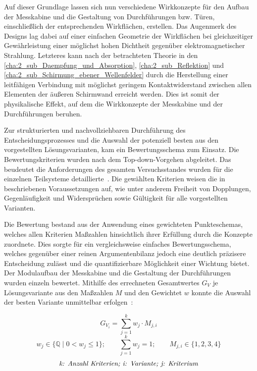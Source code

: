 Auf dieser Grundlage lassen sich nun verschiedene Wirkkonzepte für den Aufbau der Messkabine und die Gestaltung von Durchführungen bzw. Türen, einschließlich der entsprechenden Wirkflächen, erstellen. Das Augenmerk des Designs lag dabei auf einer einfachen Geometrie der Wirkflächen bei gleichzeitiger Gewährleistung einer möglichst hohen Dichtheit gegenüber elektromagnetischer Strahlung. Letzteres kann nach der betrachteten Theorie in den \Abschnitten\ref{cha:2_sub_Daempfung_und_Absorption}, \ref{cha:2_sub_Reflektion} und \ref{cha:2_sub_Schirmung_ebener_Wellenfelder} durch die Herstellung einer leitfähigen Verbindung mit möglichst geringem Kontaktwiderstand zwischen allen Elementen der äußeren Schirmwand erreicht werden. Dies ist somit der physikalische Effekt, auf dem die Wirkkonzepte der Messkabine und der Durchführungen beruhen. 
\par
\vspace{\linespace}
Zur strukturierten und nachvollziehbaren Durchführung des Entscheidungsprozesses und die Auswahl der potenziell besten aus den vorgestellten Lösungsvarianten, kam ein Bewertungsschema zum Einsatz. Die Bewertungskriterien wurden nach dem Top-down-Vorgehen abgeleitet. Das beudeutet die Anforderungen des gesamten Versuchsstandes wurden für die einzelnen Teilsysteme detaillierte~\cite{Pahl_Beitz_Konstruktionslehre}. Die gewählten Kriterien weisen die in~\cite{Pahl_Beitz_Konstruktionslehre} beschriebenen Voraussetzungen auf, wie unter anderem Freiheit von Dopplungen, Gegenläufigkeit und Widersprüchen sowie Gültigkeit für alle vorgestellten Varianten.
\par
\vspace{\linespace}
Die Bewertung bestand aus der Anwendung eines gewichteten Punkteschemas, welches allen Kriterien Maßzahlen hinsichtlich ihrer Erfüllung durch die Konzepte zuordnete. Dies sorgte für ein vergleichsweise einfaches Bewertungsschema, welches gegenüber einer reinen Argumentenbilanz jedoch eine deutlich präzisere Entscheidung zulässt und die quantifizierbare Möglichkeit einer Wichtung bietet. Der Modulaufbau der Messkabine und die Gestaltung der Durchführungen wurden einzeln bewertet. Mithilfe des errechneten Gesamtwertes $G_V$ je Lösungsvariante aus den Maßzahlen $M$ und den Gewichtet $w$ konnte die Auswahl der besten Variante unmittelbar erfolgen~\cite{Pahl_Beitz_Konstruktionslehre}:

\begin{equation}
    G_{V_i} = \sum_{j=1}^{k} w_j \cdot M_{j,i}
    \label{eq:3_Gesamtwert_Variantenvergleich}
\end{equation}
\begin{equation}
    w_j \in \{\mathbb{Q} \;\vert\; 0 < w_j \leq 1\}; \qquad \sum_{j=1}^{k} w_j = 1; \qquad M_{j,i} \in \{1,2,3,4\}
    \label{eq:3_Wichtung_Bewertung}
\end{equation}
\begin{equation*}
    \text{\textit{k: Anzahl Kriterien; i: Variante; j: Kriterium}}
\end{equation*}

